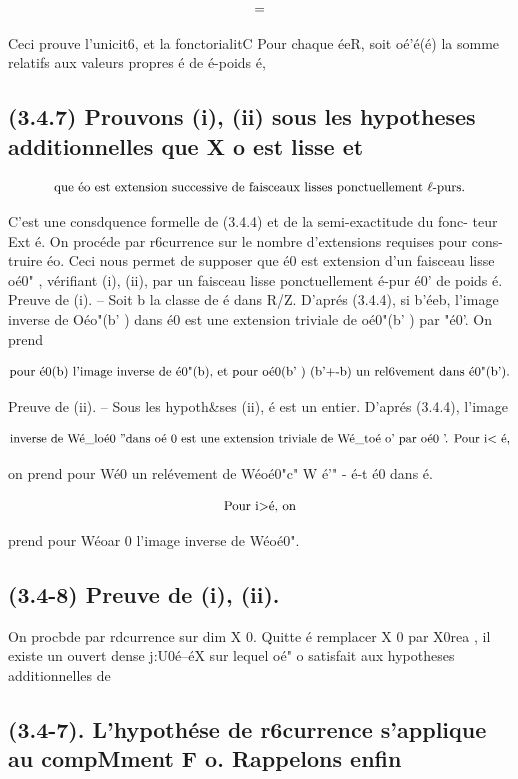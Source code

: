 \documentclass[11pt]{article}
\theoremstyle{remark}
\begin{document}
\[\text{\small =}\]

Ceci prouve l'unicit6, et la fonctorialitC Pour chaque éeR, soit oé'é(é) la somme relatifs aux valeurs propres é de é-poids é,

\subsection*{(3.4.7) Prouvons (i), (ii) sous les hypotheses additionnelles que X o est lisse et}

\[\text{\small que éo est extension successive de faisceaux lisses ponctuellement \(\ell\)-purs.}\]

C'est une consdquence formelle de (3.4.4) et de la semi-exactitude du fonc- teur Ext é. On procéde par r6currence sur le nombre d'extensions requises pour cons- truire éo. Ceci nous permet de supposer que é0 est extension d'un faisceau lisse oé0" , vérifiant (i), (ii), par un faisceau lisse ponctuellement é-pur é0' de poids é. Preuve de (i). -- Soit b la classe de é dans R/Z. D'aprés (3.4.4), si b'éeb, l'image inverse de Oéo"(b' ) dans é0 est une extension triviale de oé0"(b' ) par "é0'. On prend

\[\text{\small pour é0(b) l'image inverse de é0"(b), et pour oé0(b' ) (b'+-b) un rel6vement dans é0"(b').}\]

Preuve de (ii). -- Sous les hypoth\&ses (ii), é est un entier. D'aprés (3.4.4), l'image

\[\text{\small inverse de Wé\_loé0 ''dans oé 0 est une extension triviale de Wé\_toé o' par oé0 '. Pour i< é,}\]

on prend pour Wé0 un relévement de Wéoé0"c" W é'" - é-t é0 dans é.

\[\text{\small Pour i>é, on}\]

prend pour Wéoar 0 l'image inverse de Wéoé0".

\subsection*{(3.4-8) Preuve de (i), (ii).}

On procbde par rdcurrence sur dim X 0. Quitte é remplacer X 0 par X0rea , il existe un ouvert dense j:U0é--éX sur lequel oé" o satisfait aux hypotheses additionnelles de

\subsection*{(3.4-7). L'hypothése de r6currence s'applique au compMment F o. Rappelons enfin}
\end{document}
